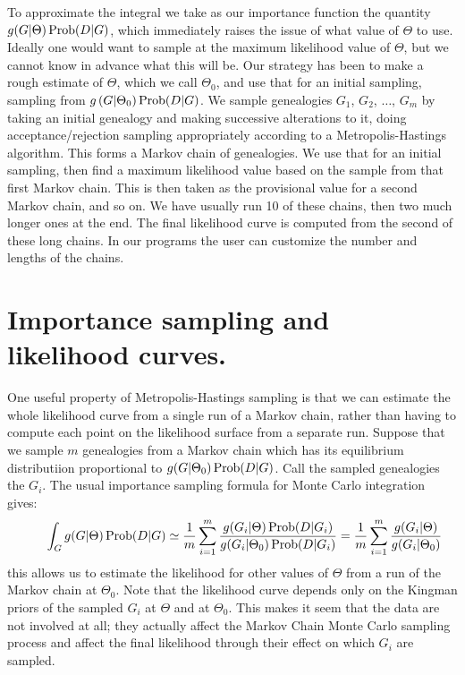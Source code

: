 To approximate the integral we take as our importance function the
quantity $g(G|\Theta) \mathop{\rm Prob}\nolimits(D|G)$, which immediately raises the issue of
what value of $\Theta$ to use.  Ideally one would want to sample at
the maximum likelihood value of $\Theta$, but we cannot know in advance
what this will be.  Our strategy has been to make a rough estimate of $\Theta$,
which we call $\Theta_0$, and use that for an initial sampling,
sampling from $g\left(G|\Theta_0\right)\mathop{\rm Prob}\nolimits(D|G)$.  We sample genealogies
$G_1$, $G_2$, $\ldots$, $G_m$ by taking an initial genealogy and making
successive alterations to it, doing acceptance/rejection sampling appropriately
according to a Metropolis-Hastings algorithm.  This forms a Markov chain of
genealogies.  We use that for an initial sampling, then find a
maximum likelihood value based on the sample from that first Markov chain.
This is then taken as the provisional value for
a second Markov chain, and so on.  We have usually run 10 of these chains,
then two much longer ones at the end.  The final likelihood curve is computed
from the second of these long chains.  In our programs the user can customize
the number and lengths of the chains.

\section{Importance sampling and likelihood curves.}

One useful property of Metropolis-Hastings sampling is that we can
estimate the whole likelihood curve from a single run of a Markov chain,
rather than having to compute each point on the likelihood surface from a
separate run.  Suppose that we sample $m$ genealogies from a Markov chain
which has its equilibrium distributiion proportional to
$g(G|\Theta_0) \mathop{\rm Prob}\nolimits(D|G)$.  Call
the sampled genealogies the $G_i$.  The usual importance sampling formula
for Monte Carlo integration gives:
\begin{equation} %
{~~~~}\,\,\,\int_G g(G|\Theta) \Prob(D|G) \simeq \frac{1}{m} \sum\limits_{i=1}^m {g(G_i|\Theta) \Prob(D|G_i) \over  g(G_i|\Theta_0) \Prob(D|G_i)} = \frac{1}{m}\sum\limits_{i=1}^m {g(G_i|\Theta) \over  g(G_i|\Theta_0)} 
\end{equation}
this allows us to estimate the likelihood for other values of $\Theta$ from
a run of the Markov chain at $\Theta_0$.  Note that the likelihood curve
depends only on the Kingman priors of the sampled $G_i$ at $\Theta$ and
at $\Theta_0$.  This makes it seem that the data are not involved at all; they
actually affect the Markov Chain Monte Carlo sampling process and affect the
final likelihood through their effect on which $G_i$ are sampled.

